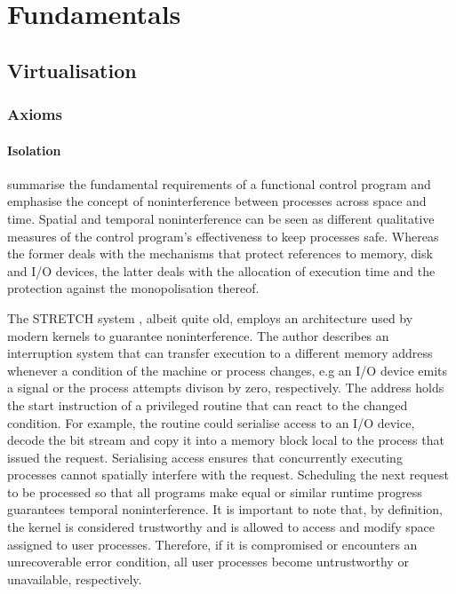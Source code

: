 \chapter{Fundamentals}
\section{Virtualisation}
\subsection{Axioms}
\subsubsection{Isolation}
\textcite{10.1145/368481.368502} summarise the fundamental
requirements of a functional control program and emphasise the concept of noninterference between 
processes across space and time. Spatial and temporal noninterference can be seen as different 
qualitative measures of the control program's effectiveness to keep processes safe. Whereas the 
former deals with the mechanisms that protect references to memory, disk and I/O devices, the latter
deals with the allocation of execution time and the protection against the monopolisation thereof.

The STRETCH system \cite{10.1145/368481.368502}, albeit quite old, employs an architecture used by 
modern kernels to guarantee noninterference. The author describes an interruption system that can 
transfer execution to a different memory address whenever a condition of the machine or process 
changes, e.g an I/O device emits a signal or the process attempts divison by zero, respectively.
The address holds the start instruction of a privileged routine that can react to the changed 
condition. For example, the routine could serialise access to an I/O device, decode the bit stream 
and copy it into a memory block local to the process that issued the request. Serialising access 
ensures that concurrently executing processes cannot spatially interfere with the request. Scheduling
the next request to be processed so that all programs make equal or similar runtime progress guarantees 
temporal noninterference. It is important to note that, by definition, the kernel is considered 
trustworthy and is allowed to access and modify space assigned to user processes. Therefore, if it is
compromised or encounters an unrecoverable error condition, all user processes become untrustworthy 
or unavailable, respectively.

